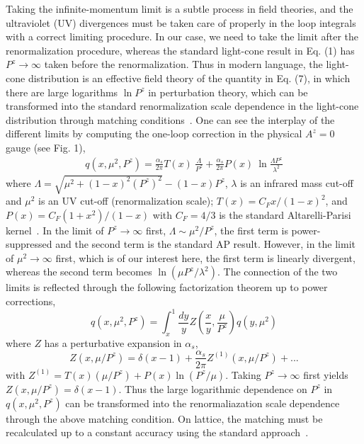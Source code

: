 \documentclass[aps,prd,preprint,tightenlines,superscriptaddress]{revtex4}
\begin{document}
Taking the infinite-momentum limit is a subtle process in field theories, and the ultraviolet (UV) divergences
must be taken care of properly in the loop integrals with a correct limiting procedure.
In our case, we need to take the limit after the renormalization procedure, whereas
the standard light-cone result in Eq. (1) has $P^z\rightarrow \infty$ taken before the
renormalization. Thus in modern language, the light-cone distribution is an effective field theory
of the quantity in Eq. (7), in which there are large logarithms $\ln P^z$ in
perturbation theory, which can be transformed into the standard renormalization
scale dependence in the light-cone distribution through matching conditions~\cite{jizhangzhao}. One can see the interplay of
the different limits by computing the one-loop correction in the physical $A^z=0$ gauge (see Fig. 1),
\begin{eqnarray}
    q(x, \mu^2, P^z) = \frac{\alpha_s}{2\pi}T(x) ~\frac{\Lambda}{P^z}+    \frac{\alpha_s}{2\pi} P(x) ~ \ln\frac{\Lambda P^z}{\lambda^2}
\end{eqnarray}
where $\Lambda = \sqrt{\mu^2 + (1-x)^2(P^{z})^2}-(1-x)P^z$, $\lambda$ is an infrared mass cut-off and
$\mu^2$ is an UV cut-off (renormalization scale);
$T(x) =C_F x/(1-x)^2$, and $P(x) = C_F (1+x^2)/(1-x)$ with $C_F=4/3$ is the standard Altarelli-Parisi kernel~\cite{AP}. In the limit of
$P^z\rightarrow \infty$ first, $\Lambda \sim \mu^2/P^z$, the first term is power-suppressed and the second term is the
standard AP result. However, in the limit of $\mu^2\rightarrow \infty$ first, which is of our interest here,
the first term is linearly divergent, whereas the second term becomes $\ln (\mu P^z/\lambda^2)$. The connection
of the two limits is reflected through the following factorization theorem up to power corrections,
\begin{equation}
    q(x, \mu^2, P^z)  = \int^1_x \frac{dy}{y} Z\left(\frac{x}{y},\frac{\mu}{P^z}\right) q(y, \mu^2)
\end{equation}
where $Z$ has a perturbative expansion in $\alpha_s$,
\begin{equation}
             Z(x, \mu/P^z) = \delta (x-1) + \frac{\alpha_s}{2\pi} Z^{(1)}(x, \mu/P^z) + ...
\end{equation}
with $Z^{(1)} = T(x)(\mu/P^z) + P(x)\ln (P^z/\mu)$. Taking $P^z \rightarrow \infty$ first
yields $Z(x, \mu/P^z) = \delta(x-1)$. Thus the large logarithmic dependence on $P^z$ in $q(x,\mu^2,P^z)$ can be transformed into the
renormaliazation scale dependence through the above matching condition.
On lattice, the matching must be recalculated up to a constant accuracy using the standard approach~\cite{ren}.
\end{document}
